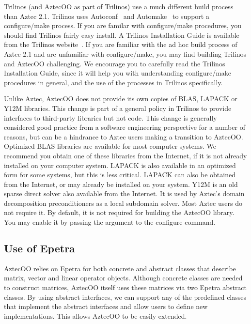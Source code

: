 \documentclass[12pt,relax]{AztecOOUserGuide}
\begin{document}
Trilinos (and AztecOO as part of Trilinos) use a much different build
process than Aztec 2.1.  Trilinos uses
Autoconf~\cite{Autoconf} and Automake~\cite{Automake} to support a configure/make
process.  If you are familar
with configure/make procedures, you should find Trilinos  fairly easy install.
A Trilinos Installation Guide is available from
the Trilinos website~\cite{Trilinos-home-page}.  If you are familiar with the ad hoc
build process of Aztec 2.1 and are unfamiliar with configure/make, you may find
building Trilinos and AztecOO challenging.  We encourage you to carefully read the
Trilinos Installation Guide, since it will help you with understanding configure/make
procedures in general, and the use of the processes in Trilinos specifically.

Unlike Aztec, AztecOO does not provide its own copies of BLAS, LAPACK or Y12M libraries.
This change is part of a general policy in Trilinos to provide interfaces to third-party
libraries but not code.  This change is generally considered good practice from a software
engineering perspective for a number of reasons, but can be a hindrance to Aztec users
making a transition to AztecOO.  Optimized BLAS libraries are available for most computer
systems.  We recommend you obtain one of these libraries from the Internet, if it is not
already installed on your computer system.  LAPACK is also available in an optimized form
for some systems, but this is less critical.  LAPACK can also be obtained from the Internet,
or may already be installed on your system.  Y12M is an old sparse direct solver also available
from the Internet.  It is used by Aztec's domain decomposition preconditioners as a local
subdomain solver.  Most Aztec users do not require it.  By default, it is not required for
building the AztecOO library.  You may enable it by passing the argument
 to the configure command.

\subsection{Use of Epetra}

AztecOO relies on Epetra for both concrete and abstract classes that
describe matrix, vector and linear operator objects.
Although  concrete classes are needed to construct matrices, AztecOO
itself uses these matrices via two Epetra abstract classes.  By using
abstract interfaces, we can support any of the predefined classes that
implement the abstract interfaces and allow users to define
new implementations.  This allows AztecOO
to be easily extended.
\end{document}
